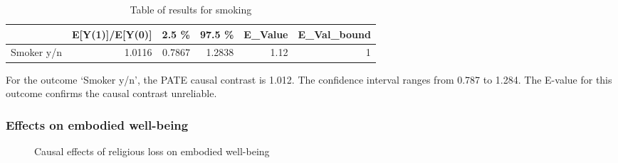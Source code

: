 \documentclass[
  singlecolumn,
  9pt]{article}
\begin{document}
\begin{longtable}[]{@{}lrrrrr@{}}

\caption{\label{tbl-results-health-rr}Table of results for smoking}

\tabularnewline

\toprule\noalign{}
& E{[}Y(1){]}/E{[}Y(0){]} & 2.5 \% & 97.5 \% & E\_Value &
E\_Val\_bound \\
\midrule\noalign{}
\endhead
\bottomrule\noalign{}
\endlastfoot
Smoker y/n & 1.0116 & 0.7867 & 1.2838 & 1.12 & 1 \\

\end{longtable}

For the outcome `Smoker y/n', the PATE causal contrast is 1.012. The
confidence interval ranges from 0.787 to 1.284. The E-value for this
outcome confirms the causal contrast unreliable.

\subsubsection{Effects on embodied
well-being}\label{effects-on-embodied-well-being}

\begin{figure}


\caption{\label{fig-results-embodied}Causal effects of religious loss on
embodied well-being}

\end{figure}%
\end{document}
